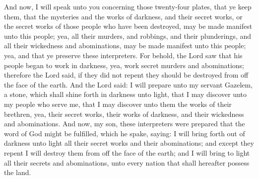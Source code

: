And now, I will speak unto you concerning those twenty-four plates, that ye keep them, that the mysteries and the works of darkness, and their secret works, or the secret works of those people who have been destroyed, may be made manifest unto this people; yea, all their murders, and robbings, and their plunderings, and all their wickedness and abominations, may be made manifest unto this people; yea, and that ye preserve these interpreters.
\bverse \iffalse For behold, the Lord saw that his people began to work in darkness, yea, work secret murders and abominations; therefore the Lord said, if they did not repent they should be destroyed from off the face of the earth. \fi
For behold, the Lord saw that his people began to work in darkness, yea, work secret murders and abominations; therefore the Lord said, if they did not repent they should be destroyed from off the face of the earth.
\bverse \iffalse And the Lord said: I will prepare unto my servant Gazelem, a stone, which shall shine forth in darkness unto light, that I may discover unto my people who serve me, that I may discover unto them the works of their brethren, yea, their secret works, their works of darkness, and their wickedness and abominations. \fi
And the Lord said: I will prepare unto my servant Gazelem, a stone, which shall shine forth in darkness unto light, that I may discover unto my people who serve me, that I may discover unto them the works of their brethren, yea, their secret works, their works of darkness, and their wickedness and abominations.
\bverse \iffalse And now, my son, these interpreters were prepared that the word of God might be fulfilled, which he spake, saying: \fi
And now, my son, these interpreters were prepared that the word of God might be fulfilled, which he spake, saying:
\bverse \iffalse I will bring forth out of darkness unto light all their secret works and their abominations; and except they repent I will destroy them from off the face of the earth; and I will bring to light all their secrets and abominations, unto every nation that shall hereafter possess the land. \fi
I will bring forth out of darkness unto light all their secret works and their abominations; and except they repent I will destroy them from off the face of the earth; and I will bring to light all their secrets and abominations, unto every nation that shall hereafter possess the land.
\bverse \iffalse And now, my son, we see that they did not repent; therefore they have been destroyed, and thus far the word of God has been fulfilled; yea, their secret abominations have been brought out of darkness and made known unto us. \fi
